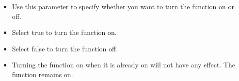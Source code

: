 % 
\begin{itemize}
\item Use this parameter to specify whether you want to turn the function on or off.
\item Select true{} to turn the function on.
\item Select false{} to turn the function off.
\item Turning the function on when it is already on will not have any effect. The function remains on.
\end{itemize}
